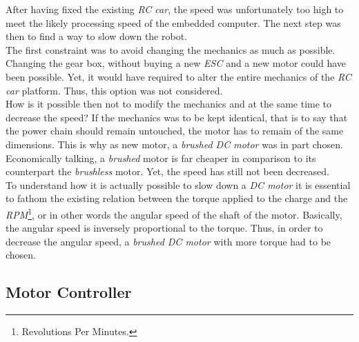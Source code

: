		After having fixed the existing \textit{RC car}, the speed was unfortunately 
		too high to meet the likely processing speed of the embedded computer.
		The next step
		was then to find a way to slow down the robot. 
		\\\indent The first constraint was to avoid changing the mechanics as much as
		possible. Changing the gear box, without buying a new \textit{ESC} and a new
		motor could have been possible. Yet, it would have required to alter 
		the entire mechanics of the \textit{RC car} platform. Thus, this option was 
		not considered.
		\\\indent How is it possible then not to modify the mechanics and
		at the same time to decrease the speed? If the mechanics was to 
		be kept identical, that is to say that the power chain should 
		remain untouched, the motor has to remain of the same dimensions.
		This is why as new motor, a \textit{brushed DC motor} was in part 
		chosen. Economically talking, a \textit{brushed} motor is far cheaper
		in comparison to its counterpart the \textit{brushless} motor. Yet, the
		speed has still not been decreased.
		\\\indent To understand how it is actually possible to 
		slow down a \textit{DC motor} it is essential to fathom the 
		existing relation between the torque applied to the charge
		and the \textit{RPM}\footnote{Revolutions Per Minutes.},
		or in other words the angular speed 
		of the shaft of the motor. Basically, the angular speed is
		inversely proportional 
		to the torque. Thus, in order to decrease the angular speed, a 
		\textit{brushed DC motor} with more torque had to be chosen. \cite{bonanza, motor}
		
		\subsection{Motor Controller}
		

